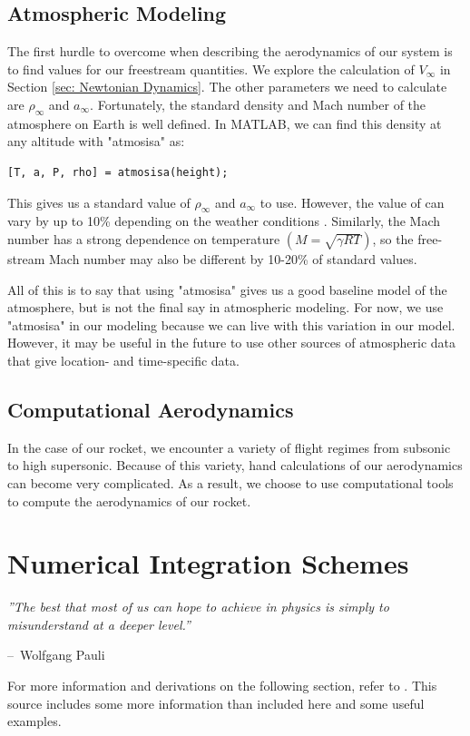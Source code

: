 \documentclass[12pt]{report}
\makeatletter
\newenvironment{chapquote}[2][2em]
  {\setlength{\@tempdima}{#1}%
   \def\chapquote@author{#2}%
   \parshape 1 \@tempdima \dimexpr\textwidth-2\@tempdima\relax%
   \itshape}
  {\par\normalfont\hfill--\ \chapquote@author\hspace*{\@tempdima}\par\bigskip}
\makeatother
\begin{document}
\section{Atmospheric Modeling}
The first hurdle to overcome when describing the aerodynamics of our system is to find values for our \gls{freestream} quantities. We explore the calculation of $V_{\infty}$ in Section \ref{sec: Newtonian Dynamics}. The other parameters we need to calculate are $\rho_{\infty}$ and $a_{\infty}$. Fortunately, the standard density and Mach number of the atmosphere on Earth is well defined. In MATLAB, we can find this density at any altitude with "atmosisa" as:
\begin{lstlisting}[style=Matlab-editor]
    [T, a, P, rho] = atmosisa(height);
\end{lstlisting}
This gives us a standard value of $\rho_{\infty}$ and $a_{\infty}$ to use. However, the value of can vary by up to 10\% depending on the weather conditions \cite{svickova_air_2020}. Similarly, the Mach number has a strong dependence on temperature $\left(M=\sqrt{\gamma RT}\right)$, so the free-stream Mach number may also be different by 10-20\% of standard values. 

All of this is to say that using "atmosisa" gives us a good baseline model of the atmosphere, but is not the final say in atmospheric modeling. For now, we use "atmosisa" in our modeling because we can live with this variation in our model. However, it may be useful in the future to use other sources of atmospheric data that give location- and time-specific data.
\section{Computational Aerodynamics}
In the case of our rocket, we encounter a variety of flight regimes from subsonic to high supersonic. Because of this variety, hand calculations of our aerodynamics can become very complicated. As a result, we choose to use computational tools to compute the aerodynamics of our rocket.

\chapter{Numerical Integration Schemes}

\begin{chapquote}{Wolfgang Pauli}
    ''The best that most of us can hope to achieve in physics is simply to misunderstand at a deeper level.''
\end{chapquote}
For more information and derivations on the following section, refer to \cite{trench_31_2020}. This source includes some more information than included here and some useful examples.
\end{document}
